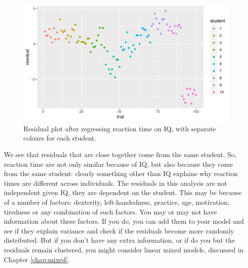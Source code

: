 \documentclass[]{report}\usepackage[]{graphicx}\usepackage[]{color}
\makeatletter
\def\maxwidth{ %
  \ifdim\Gin@nat@width>\linewidth
    \linewidth
  \else
    \Gin@nat@width
  \fi
}
\newenvironment{knitrout}{}{} %
\makeatother
\begin{document}
\begin{knitrout}
\color{fgcolor}\begin{figure}

{\centering \includegraphics[width=\maxwidth]{figure/ass_9-1} 

}

\caption[Residual plot after regressing reaction time on IQ, with separate colours for each student]{Residual plot after regressing reaction time on IQ, with separate colours for each student.}\label{fig:ass_9}
\end{figure}


\end{knitrout}

We see that residuals that are close together come from the same student. So, reaction time are not only similar because of IQ, but also because they come from the same student: clearly something other than IQ explains why reaction times are different across individuals. The residuals in this analysis are not independent given IQ, they are dependent on the student. This may be because of a number of factors: dexterity, left-handedness, practice, age, motivation, tiredness or any combination of such factors. You may or may not have information about these factors. If you do, you can add them to your model and see if they explain variance and check if the residuals become more randomly distributed. But if you don't have any extra information, or if do you but the residuals remain clustered, you might consider linear mixed models, discussed in Chapter \ref{chap:mixed}.
\end{document}
